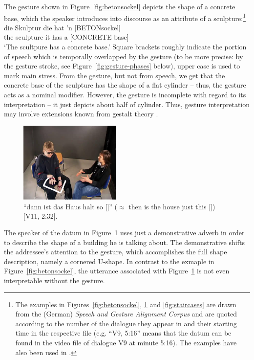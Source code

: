 \documentclass[output=paper]{langsci/langscibook}
\begin{document}
The gesture shown in Figure~\ref{fig:betonsockel} depicts the shape of a concrete base, which the speaker introduces into discourse as an attribute of a sculpture:\footnote{The examples in Figures~\ref{fig:betonsockel}, \ref{fig:so} and \ref{fig:staircases} are drawn from the (German) \emph{Speech and Gesture Alignment Corpus} \citep[,][]{Luecking:Bergmann:Hahn:Kopp:Rieser:2010} and are quoted according to the number of the dialogue they appear in and their starting time in the respective file (e.g. \enquote{V9, 5:16} means that the datum can be found in the video file of dialogue V9 at minute 5:16). The examples have also been used in \citet{Luecking:2016}.}
%
\ea \label{ex:betonsockel}
\gll die Skulptur die hat 'n [BETONsockel] \\
     the sculpture it has a {[CONCRETE base]} \\
\glt \enquote*{The scultpure has a concrete base.}
\z
%
Square brackets roughly indicate the portion of speech which is temporally overlapped by the gesture (to be more precise: by the gesture stroke, see Figure~\ref{fig:gesture-phases} below), upper case is used to mark main stress.
%
From the gesture, but not from speech, we get that the concrete base of the sculpture has the shape of a flat cylinder -- thus, the gesture acts as a nominal modifier.
%
However, the gesture is incomplete with regard to its interpretation -- it just depicts about half of cylinder. 
%
Thus, gesture interpretation may involve extensions known from gestalt theory \citetext{see \citealp{Luecking:2016} on a \emph{good continuation}  constraint}.


\begin{figure}
  \centering
  \includegraphics[width=5cm]{figures/mmsubcat2}
  \caption{\enquote{dann ist das Haus halt so []} ($\approx$ then is the house just this []) [V11, 2:32].}
  \label{fig:so}
\end{figure}

The speaker of the datum in Figure~\ref{fig:so} uses just a demonstrative adverb in order to describe the shape of a building he is talking about.
%
The demonstrative shifts the addressee's attention to the gesture, which accomplishes the full shape description, namely a cornered U-shape.
%
In contrast to the exmaple in Figure~\ref{fig:betonsockel}, the utterance associated with Figure~\ref{fig:so} is not even interpretable without the gesture.
\end{document}
